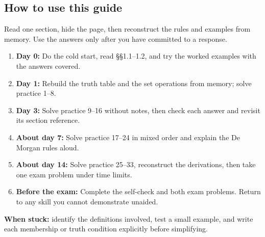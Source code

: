 \documentclass[11pt]{article}
\begin{document}
\begin{keepsection}
\section{How to use this guide}

Read one section, hide the page, then reconstruct the rules and examples from memory. Use the answers only after you have committed to a response.

\begin{enumerate}
\item \textbf{Day 0:} Do the cold start, read §§1.1–1.2, and try the worked examples with the answers covered.
\item \textbf{Day 1:} Rebuild the truth table and the set operations from memory; solve practice 1–8.
\item \textbf{Day 3:} Solve practice 9–16 without notes, then check each answer and revisit its section reference.
\item \textbf{About day 7:} Solve practice 17–24 in mixed order and explain the De Morgan rules aloud.
\item \textbf{About day 14:} Solve practice 25–33, reconstruct the derivations, then take one exam problem under time limits.
\item \textbf{Before the exam:} Complete the self-check and both exam problems. Return to any skill you cannot demonstrate unaided.
\end{enumerate}

\begin{notebox}\textbf{When stuck:} identify the definitions involved, test a small example, and write each membership or truth condition explicitly before simplifying.\end{notebox}
\end{keepsection}
\end{document}
